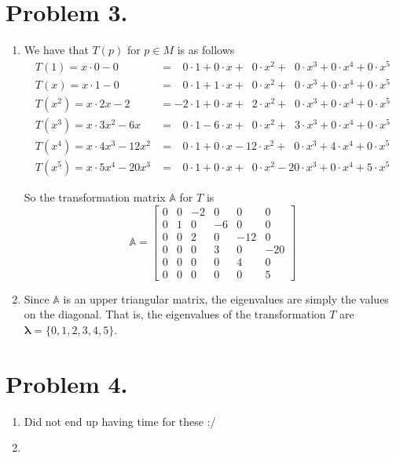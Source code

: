 \documentclass[a4paper,11pt,norsk]{article}
\begin{document}
\section*{Problem 3.}
\begin{enumerate}
    \item We have that $T(p)$ for $p \in M$ is as follows
        \begin{align*}
            T(1)   = x \cdot 0 - 0        &=  \:\:\,\,0 \cdot 1 + 0 \cdot x + \:\,\,0 \cdot x^2 + \:\,\,0 \cdot x^3 + 0 \cdot x^4 + 0 \cdot x^5 \\
            T(x)   = x \cdot 1 - 0        &=  \:\:\,\,0 \cdot 1 + 1 \cdot x + \:\,\,0 \cdot x^2 + \:\,\,0 \cdot x^3 + 0 \cdot x^4 + 0 \cdot x^5 \\
            T(x^2) = x \cdot 2x   - 2     &=         -2 \cdot 1 + 0 \cdot x + \:\,\,2 \cdot x^2 + \:\,\,0 \cdot x^3 + 0 \cdot x^4 + 0 \cdot x^5 \\
            T(x^3) = x \cdot 3x^2 - 6x    &=  \:\:\,\,0 \cdot 1 - 6 \cdot x + \:\,\,0 \cdot x^2 + \:\,\,3 \cdot x^3 + 0 \cdot x^4 + 0 \cdot x^5 \\
            T(x^4) = x \cdot 4x^3 - 12x^2 &=  \:\:\,\,0 \cdot 1 + 0 \cdot x       -12 \cdot x^2 + \:\,\,0 \cdot x^3 + 4 \cdot x^4 + 0 \cdot x^5 \\
            T(x^5) = x \cdot 5x^4 - 20x^3 &=  \:\:\,\,0 \cdot 1 + 0 \cdot x + \:\,\,0 \cdot x^2       -20 \cdot x^3 + 0 \cdot x^4 + 5 \cdot x^5
        \end{align*}

        So the transformation matrix $\mathbb{A}$ for $T$ is 
        \[
            \mathbb{A} = \begin{bmatrix}
                0 & 0 & -2 &  0 &   0 &   0 \\
                0 & 1 &  0 & -6 &   0 &   0 \\
                0 & 0 &  2 &  0 & -12 &   0 \\
                0 & 0 &  0 &  3 &   0 & -20 \\
                0 & 0 &  0 &  0 &   4 &   0 \\
                0 & 0 &  0 &  0 &   0 &   5 
            \end{bmatrix}
        \]
    \item Since $\mathbb{A}$ is an upper triangular matrix, the eigenvalues are simply the values on the diagonal. That is, the eigenvalues of the transformation $T$ are
        $\boldsymbol{\lambda} = \{0, 1, 2, 3, 4, 5\}$.
\end{enumerate}

\section*{Problem 4.}
\begin{enumerate}
    \item Did not end up having time for these :/
    \item 
\end{enumerate}
\end{document}
